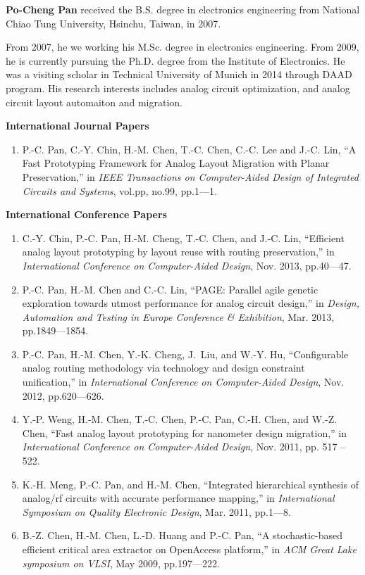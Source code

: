 
{\bf Po-Cheng Pan} received the B.S. degree in electronics engineering from National Chiao Tung University, Hsinchu, Taiwan, in 2007. 

From 2007, he we working his M.Sc. degree in electronics engineering. From 2009, he is currently pursuing the Ph.D. degree from the Institute of Electronics. He was a visiting scholar in Technical University of Munich in 2014 through DAAD program. His research interests includes analog circuit optimization, and analog circuit layout automaiton and migration. 

{\bf International Journal Papers}
\begin{enumerate}
  \item P.-C. Pan, C.-Y. Chin, H.-M. Chen, T.-C. Chen, C.-C. Lee and J.-C. Lin, ``A Fast Prototyping Framework for Analog Layout Migration with Planar Preservation,'' in \emph{IEEE Transactions on Computer-Aided Design of Integrated Circuits and Systems}, vol.pp, no.99, pp.1---1. 
\end{enumerate}
{\bf International Conference Papers}
\begin{enumerate}
  \item C.-Y. Chin, P.-C. Pan, H.-M. Cheng, T.-C. Chen, and J.-C. Lin, ``Efficient analog layout prototyping by layout reuse with routing preservation,'' in \emph{International Conference on Computer-Aided Design}, Nov. 2013, pp.40---47.
  \item P.-C. Pan, H.-M. Chen and C.-C. Lin, ``PAGE: Parallel agile genetic exploration towards utmost performance for analog circuit design,'' in \emph{Design, Automation and Testing in Europe Conference \& Exhibition}, Mar. 2013, pp.1849---1854.
  \item P.-C. Pan, H.-M. Chen, Y.-K. Cheng, J.~Liu, and W.-Y. Hu, ``Configurable analog routing methodology via technology and design constraint unification,'' in \emph{International Conference on Computer-Aided Design}, Nov. 2012, pp.620---626.
  \item Y.-P. Weng, H.-M. Chen, T.-C. Chen, P.-C. Pan, C.-H. Chen, and W.-Z. Chen, ``Fast analog layout prototyping for nanometer design migration,'' in \emph{International Conference on Computer-Aided Design}, Nov. 2011, pp. 517 -- 522.
  \item K.-H. Meng, P.-C. Pan, and H.-M. Chen, ``Integrated hierarchical synthesis of analog/rf circuits with accurate performance mapping,'' in \emph{International Symposium on Quality Electronic Design}, Mar. 2011, pp.1---8. 
  \item B.-Z. Chen, H.-M. Chen, L.-D. Huang and P.-C. Pan, ``A stochastic-based efficient critical area extractor on OpenAccess platform,'' in \emph{ACM Great Lake symposium on VLSI}, May 2009, pp.197---222.

\end{enumerate}
